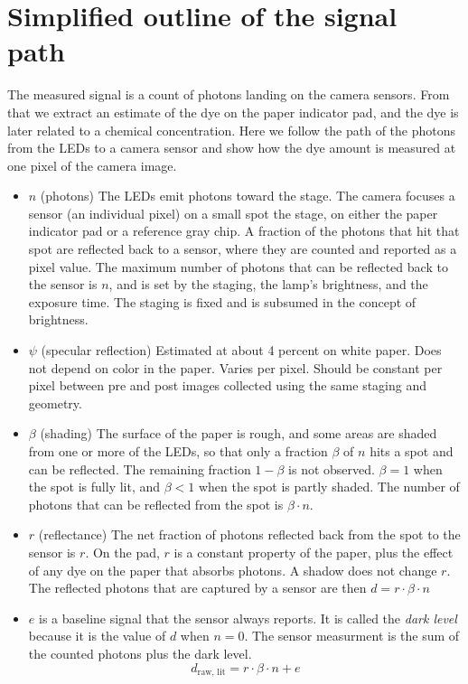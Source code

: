 \documentclass[11pt,letter]{article}
\begin{document}
\section{Simplified outline of the signal path}
\label{sec:thought}

The measured signal is a count of photons landing on the camera sensors.  
From that we extract an estimate of the dye on the paper indicator pad, 
and the dye is later related to a chemical concentration. 
Here we follow the path of the photons from the LEDs to a camera sensor and show how the dye amount is measured at one pixel of the camera image.
\begin{itemize}[nosep]
  \item $n$ (photons) The LEDs emit photons toward the stage. %
    The camera focuses a sensor (an individual pixel) on a small spot the stage, on either the paper indicator pad or a reference gray chip. 
    A fraction of the photons that hit that spot are reflected back to a sensor, where they are counted and reported as a pixel value.
    The maximum number of photons that can be reflected back to the sensor is $n$, 
    and is set by the staging, the lamp's brightness, and the exposure time.  
    The staging is fixed and is subsumed in the concept of brightness.
  \item$\psi$ (specular reflection) Estimated at about 4 percent on white paper.  
    Does not depend on color in the paper.  Varies per pixel.
    Should be constant per pixel between pre and post images collected using the same staging and geometry.
  \item$\beta$ (shading)  The surface of the paper is rough, and some areas are shaded from one or more of the LEDs,
    so that only a fraction $\beta$ of $n$ hits a spot and can be reflected.  
    The remaining fraction $1-\beta$ is not observed.
   	$\beta = 1$ when the spot is fully lit, and $\beta < 1$ when the spot is partly shaded.
   	The number of photons that can be reflected from the spot is $\beta \cdot n$.
  \item $r$ (reflectance)  The net fraction of photons reflected back from the spot to the sensor is $r$.  
    On the pad, $r$ is a constant property of the paper, plus the effect of any dye on the paper that absorbs photons. 
    A shadow does not change $r$.
    The reflected photons that are captured by a sensor are then $d = r \cdot \beta \cdot n$
  \item $e$ is a baseline signal that the sensor always reports. 
    It is called the \textit{dark level} because it is the value of $d$ when $n=0$.
    The sensor measurment is the sum of the counted photons plus the dark level.
    \begin{equation}
    	d_\text{raw, lit} = r \cdot \beta \cdot n + e
    \end{equation}
\end{itemize}
\end{document}
